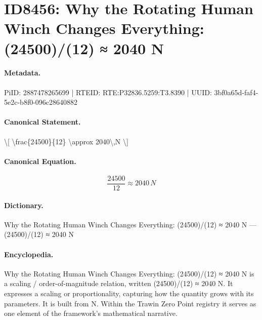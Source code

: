 \section*{ID8456: Why the Rotating Human Winch Changes Everything: (24500)/(12) ≈ 2040 N}
\paragraph{Metadata.}
PiID: 2887478265699 | RTEID: RTE:P32836.5259:T3.8390 | UUID: 3bf0a65d-faf4-5e2c-b8f0-096c28640882

\paragraph{Canonical Statement.}
\textbackslash{}[ \textbackslash{}frac\{24500\}\{12\} \textbackslash{}approx 2040\textbackslash{},N \textbackslash{}]

\paragraph{Canonical Equation.}
\[
\frac{24500}{12} \approx 2040\,N
\]

\paragraph{Dictionary.}
Why the Rotating Human Winch Changes Everything: (24500)/(12) ≈ 2040 N — (24500)/(12) ≈ 2040 N

\paragraph{Encyclopedia.}
Why the Rotating Human Winch Changes Everything: (24500)/(12) ≈ 2040 N is a scaling / order-of-magnitude relation, written (24500)/(12) ≈ 2040 N. It expresses a scaling or proportionality, capturing how the quantity grows with its parameters. It is built from N. Within the Trawin Zero Point registry it serves as one element of the framework's mathematical narrative.
